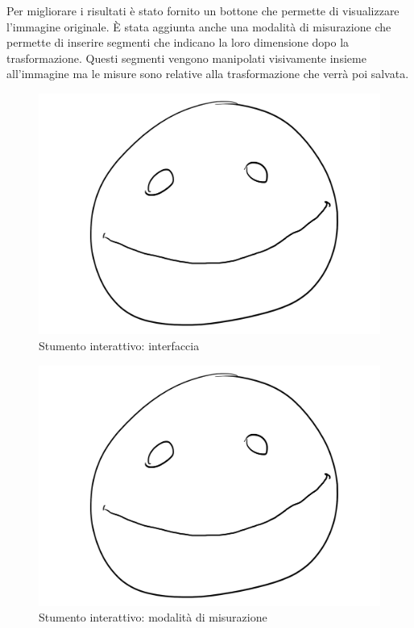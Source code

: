 Per migliorare i risultati è stato fornito un bottone che permette di visualizzare l'immagine originale.
È stata aggiunta anche una modalità di misurazione che permette di inserire segmenti che indicano la loro dimensione dopo la trasformazione.
Questi segmenti vengono manipolati visivamente insieme all'immagine ma le misure sono relative alla trasformazione che verrà poi salvata.

\begin{figure}
    \caption{Stumento interattivo: interfaccia}
    \label{fig:tool view}
    \centering
    \includegraphics[width=.66\textwidth]{images/placeholder.png}
\end{figure}

\begin{figure}
    \caption{Stumento interattivo: modalità di misurazione}
    \label{fig:tool measure}
    \centering
    \includegraphics[width=.66\textwidth]{images/placeholder.png}
\end{figure}
